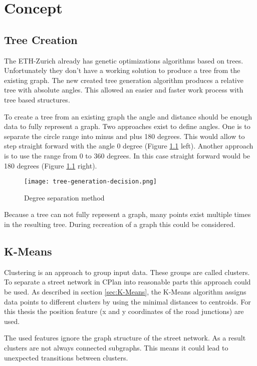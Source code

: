 \chapter{Concept}
\section{Tree Creation}
\label{sec:tree_creation_angle}
The ETH-Zurich already has genetic optimizations algorithms based on trees. Unfortunately they don't have a working solution to produce a tree from the existing graph. The new created tree generation algorithm produces a relative tree with absolute angles. This allowed an easier and faster work process with tree based structures.

To create a tree from an existing graph the angle and distance should be enough data to fully represent a graph.
Two approaches exist to define angles. One is to separate the circle range into minus and plus 180 degrees. This would allow to step straight forward with the angle 0 degree (Figure \ref{fig:tree-generation-decision} left). Another approach is to use the range from 0 to 360 degrees. In this case straight forward would be 180 degrees (Figure \ref{fig:tree-generation-decision} right).

\begin{figure}[!ht]
    \centering
    \texttt{[image: tree-generation-decision.png]}
    \caption{Degree separation method \label{fig:tree-generation-decision}}
\end{figure}

Because a tree can not fully represent a graph, many points exist multiple times in the resulting tree. During recreation of a graph this could be considered.

\FloatBarrier
\pagebreak
\section{K-Means}
Clustering is an approach to group input data. These groups are called clusters. To separate a street network in CPlan into reasonable parts this approach could be used. As described in section \ref{sec:K-Means}, the K-Means algorithm assigns data points to different clusters by using the minimal distances to centroids. For this thesis the position feature (x and y coordinates of the road junctions) are used.

The used features ignore the graph structure of the street network. As a result clusters are not always connected subgraphs. This means it could lead to unexpected transitions between clusters.

